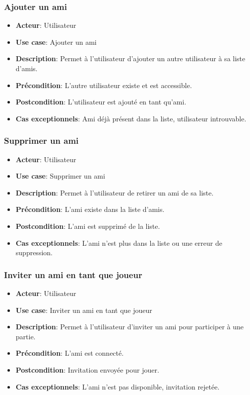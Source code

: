 \documentclass{article}
\begin{document}
\subsubsection{Ajouter un ami}
\begin{itemize}
    \item \textbf{Acteur}: Utilisateur
    \item \textbf{Use case}: Ajouter un ami
    \item \textbf{Description}: Permet à l'utilisateur d'ajouter un autre utilisateur à sa liste d'amis.
    \item \textbf{Précondition}: L'autre utilisateur existe et est accessible.
    \item \textbf{Postcondition}: L'utilisateur est ajouté en tant qu'ami.
    \item \textbf{Cas exceptionnels}: Ami déjà présent dans la liste, utilisateur introuvable.
\end{itemize}

\subsubsection{Supprimer un ami}
\begin{itemize}
    \item \textbf{Acteur}: Utilisateur
    \item \textbf{Use case}: Supprimer un ami
    \item \textbf{Description}: Permet à l'utilisateur de retirer un ami de sa liste.
    \item \textbf{Précondition}: L'ami existe dans la liste d'amis.
    \item \textbf{Postcondition}: L'ami est supprimé de la liste.
    \item \textbf{Cas exceptionnels}: L'ami n'est plus dans la liste ou une erreur de suppression.
\end{itemize}

\subsubsection{Inviter un ami en tant que joueur}
\begin{itemize}
    \item \textbf{Acteur}: Utilisateur
    \item \textbf{Use case}: Inviter un ami en tant que joueur
    \item \textbf{Description}: Permet à l'utilisateur d'inviter un ami pour participer à une partie.
    \item \textbf{Précondition}: L'ami est connecté.
    \item \textbf{Postcondition}: Invitation envoyée pour jouer.
    \item \textbf{Cas exceptionnels}: L'ami n'est pas disponible, invitation rejetée.
\end{itemize}
\end{document}
